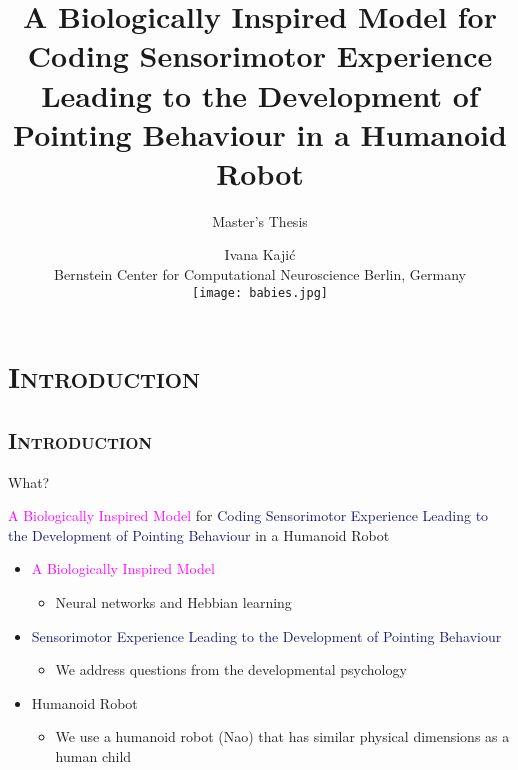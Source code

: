 \documentclass[xcolor=x11names,dvipsnames,compress]{beamer}
\renewcommand{\(}{\begin{columns}}
\renewcommand{\)}{\end{columns}}
\newcommand{\<}[1]{\begin{column}{#1}}
\renewcommand{\>}{\end{column}}
\begin{document}
\section{\scshape Introduction}
\begin{frame}
\title{A Biologically Inspired Model for Coding Sensorimotor Experience Leading to the Development of Pointing Behaviour in a Humanoid Robot}
\subtitle{Master's Thesis}
\author{
	Ivana Kaji\'c\\
	Bernstein Center for Computational Neuroscience Berlin, Germany \\
	\texttt{[image: babies.jpg]}
}
\date{}
\titlepage
\end{frame}


\subsection{\scshape Introduction}
\begin{frame}{What?}

\textcolor{Fuchsia}{A Biologically Inspired Model} for \textcolor{MidnightBlue}{Coding Sensorimotor Experience Leading to the Development of Pointing Behaviour} in a \textcolor{Emerald}{Humanoid Robot}


 \begin{itemize} 
      \item \textcolor{Fuchsia}{A Biologically Inspired Model}
      \begin{itemize}
      \item Neural networks and Hebbian learning
      \end{itemize}
     \item \textcolor{MidnightBlue}{Sensorimotor Experience Leading to the Development of Pointing Behaviour}
     \begin{itemize}
      \item We address questions from the developmental psychology
     \end{itemize}
     \item \textcolor{Emerald}{Humanoid Robot}
     \begin{itemize}
      \item We use a humanoid robot (Nao) that has similar physical dimensions as a human child
     \end{itemize}
 \end{itemize}
\end{frame}
\end{document}

